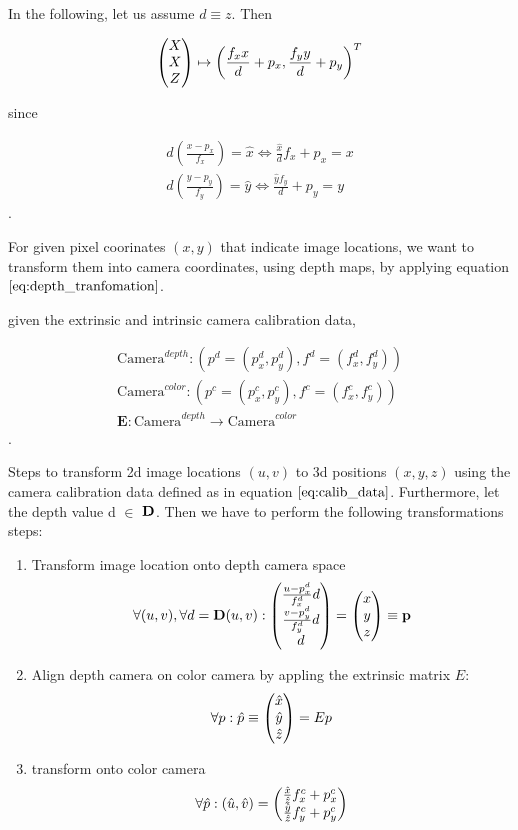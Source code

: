 In the following, let us assume $d \equiv z$. Then

\begin{equation}
	\colvec[X]{X}{Z} \mapsto \left( \frac{f_x x}{d} + p_x, \frac{f_y y}{d} + p_y \right)^T
\end{equation}

since

\begin{equation}
\begin{aligned}
	d \left( \frac{x - p_x}{f_x} \right) = \hat{x} \Leftrightarrow \frac{\hat{x}}{d} f_x + p_x = x \\
	d \left( \frac{y - p_y}{f_y} \right) = \hat{y} \Leftrightarrow \frac{\hat{y} f_y}{d} + p_y = y 
\end{aligned}
\label{eq:depth_tranfomation}
\end{equation}.

For given pixel coorinates $\left( x,y \right)$ that indicate image locations, we want to transform them into camera coordinates, using depth maps, by applying equation $\ref{eq:depth_tranfomation}$.

given the extrinsic and intrinsic camera calibration data,

\begin{equation}
\begin{aligned}
	\text{Camera}^{depth} : \left( p^d = (p_x^d, p_y^d), f^d = (f_x^d, f_y^d)\right) \\
	\text{Camera}^{color} : \left( p^c = (p_x^c, p_y^c), f^c = (f_x^c, f_y^c)\right) \\
	\textbf{E} : \text{Camera}^{depth} \rightarrow \text{Camera}^{color}
\end{aligned}
\label{eq:calib_data}
\end{equation}.

Steps to transform 2d image locations $\left( u, v \right)$ to 3d positions $\left( x, y, z \right)$ using the camera calibration data defined as in equation $\ref{eq:calib_data}$. Furthermore, let the depth value d $\in$ $\bf{D}$. Then we have to perform the following transformations steps:

\begin{enumerate}
\item Transform image location onto depth camera space
\begin{equation}
	\forall (u, v), \forall d = \textbf{D}(u,v): \colvec[\frac{u - p_x^d}{f_x^d} d]{\frac{v - p_y^d}{f_y^d} d}{d} = \colvec[x]{y}{z} \equiv \bf{p}
\end{equation}
\item Align depth camera on color camera by appling the extrinsic matrix $E$:
\begin{equation}
	\forall p: \hat{p} \equiv \colvec[\hat{x}]{\hat{y}}{\hat{z}} =  E p
\end{equation}
\item transform onto color camera
\begin{equation}
	\forall \hat{p} : \left( \hat{u}, \hat{v}\right) = \colvec{\frac{\hat{x}}{\hat{z}} f_x^c + p_x^c}{\frac{\hat{y}}{\hat{z}} f_y^c + p_y^c}
\end{equation}
\end{enumerate}



